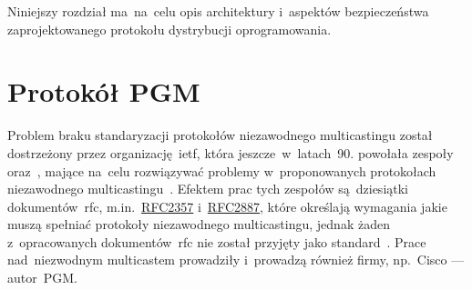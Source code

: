 \documentclass[thesis]{subfiles}
\begin{document}
Niniejszy rozdział ma~na~celu opis architektury i~aspektów bezpieczeństwa zaprojektowanego protokołu dystrybucji oprogramowania.



\section{Protokół PGM}
\label{sec:pgm}

Problem braku standaryzacji protokołów niezawodnego multicastingu został dostrzeżony przez organizację~\gls{ietf}, która jeszcze~w~latach~90. powołała zespoły  oraz~, mające na~celu rozwiązywać problemy w~proponowanych protokołach niezawodnego multicastingu~\cite{reliable-multicast-journal,reliable-multicast-transport}. Efektem prac tych zespołów są~dziesiątki dokumentów~\gls{rfc}, m.in.~\href{https://tools.ietf.org/html/rfc2357.html}{RFC2357} i~\href{https://tools.ietf.org/html/rfc2887}{RFC2887}, które określają wymagania jakie muszą spełniać protokoły niezawodnego multicastingu, jednak żaden z~opracowanych dokumentów~\gls{rfc} nie został przyjęty jako standard~\cite{rfc2887,rfc2357}. Prace nad~niezwodnym multicastem prowadziły i~prowadzą również firmy, np.~Cisco --- autor~PGM.
\end{document}
